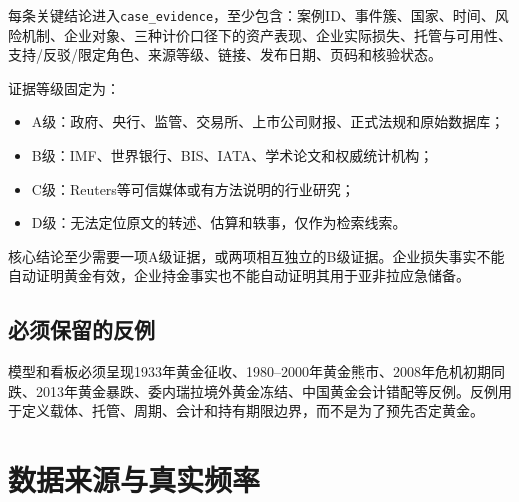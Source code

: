 \documentclass[UTF8,fontset=windows,12pt,openany]{ctexbook}
\newcommand{\Field}[1]{{\small\nolinkurl{#1}}}
\begin{document}
每条关键结论进入\Field{case_evidence}，至少包含：案例ID、事件簇、国家、时间、风险机制、企业对象、三种计价口径下的资产表现、企业实际损失、托管与可用性、支持/反驳/限定角色、来源等级、链接、发布日期、页码和核验状态。

证据等级固定为：

\begin{itemize}
  \item A级：政府、央行、监管、交易所、上市公司财报、正式法规和原始数据库；
  \item B级：IMF、世界银行、BIS、IATA、学术论文和权威统计机构；
  \item C级：Reuters等可信媒体或有方法说明的行业研究；
  \item D级：无法定位原文的转述、估算和轶事，仅作为检索线索。
\end{itemize}

核心结论至少需要一项A级证据，或两项相互独立的B级证据。企业损失事实不能自动证明黄金有效，企业持金事实也不能自动证明其用于亚非拉应急储备。

\section{必须保留的反例}

模型和看板必须呈现1933年黄金征收、1980--2000年黄金熊市、2008年危机初期同跌、2013年黄金暴跌、委内瑞拉境外黄金冻结、中国黄金会计错配等反例。反例用于定义载体、托管、周期、会计和持有期限边界，而不是为了预先否定黄金。

\chapter{数据来源与真实频率}
\end{document}
